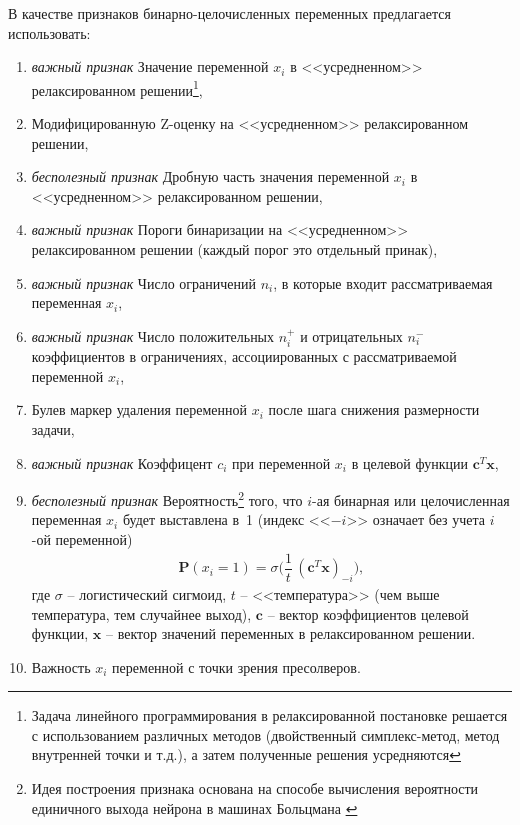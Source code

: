 \documentclass[%
	11pt,
	a4paper,
	utf8,
		]{article}
\begin{document}
В качестве признаков бинарно-целочисленных переменных предлагается использовать:
\begin{enumerate}
	\item {\color{deepgreen} \itshape важный признак} Значение переменной $ x_i $ в <<усредненном>> релаксированном решении\footnote{Задача линейного программирования в релаксированной постановке решается с использованием различных методов (двойственный симплекс-метод, метод внутренней точки и т.д.), а затем полученные решения усредняются},
	
	\item Модифицированную Z-оценку на <<усредненном>> релаксированном решении,
	
	\item {\color{red} \itshape бесполезный признак} Дробную часть значения переменной $ x_i $ в <<усредненном>> релаксированном решении,
	
	\item {\color{deepgreen} \itshape важный признак} Пороги бинаризации на <<усредненном>> релаксированном решении (каждый порог это отдельный принак),
	
	\item {\color{deepgreen} \itshape важный признак} Число ограничений $ n_i $, в которые входит рассматриваемая переменная $ x_i $,
	
	\item {\color{deepgreen} \itshape важный признак} Число положительных $ n_i^{+} $ и отрицательных $ n_i^{-} $ коэффициентов в ограничениях, ассоциированных с рассматриваемой переменной $ x_i $,
	
	\item Булев маркер удаления переменной $ x_i $ после шага снижения размерности задачи,
	
	\item {\color{deepgreen} \itshape важный признак} Коэффицент $ c_i $ при переменной $ x_i $ в целевой функции $ \mathbf{c}^T \mathbf{x} $,
	
	\item {\color{red} \itshape бесполезный признак} Вероятность\footnote{Идея построения признака основана на способе вычисления вероятности единичного выхода нейрона в машинах Больцмана \cite[]{geron:ml-2018}} того, что $ i $-ая бинарная или целочисленная переменная $ x_i $ будет выставлена в~1 (индекс <<$ {-i} $>> означает без учета $ i $-ой переменной)
	\begin{align*}
		\mathbf{P}(x_i = 1) = \sigma \bigg( \dfrac{1}{t} \, (\mathbf{c}^T \mathbf{x})_{-i} \bigg),
	\end{align*}
	где $ \sigma $ -- логистический сигмоид, $ t $ -- <<температура>> (чем выше температура, тем случайнее выход), $ \mathbf{c} $ -- вектор коэффициентов целевой функции, $ \mathbf{x} $ -- вектор значений переменных в релаксированном решении.
	
	\item Важность $ x_i $ переменной с точки зрения пресолверов.
\end{enumerate}
\end{document}
